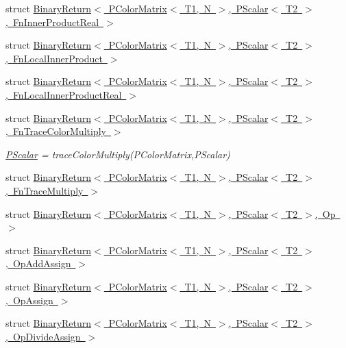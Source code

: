 \begin{DoxyCompactItemize}
\item 
struct \mbox{\hyperlink{structENSEM_1_1BinaryReturn_3_01PColorMatrix_3_01T1_00_01N_01_4_00_01PScalar_3_01T2_01_4_00_01FnInnerProductReal_01_4}{Binary\+Return$<$ P\+Color\+Matrix$<$ T1, N $>$, P\+Scalar$<$ T2 $>$, Fn\+Inner\+Product\+Real $>$}}
\item 
struct \mbox{\hyperlink{structENSEM_1_1BinaryReturn_3_01PColorMatrix_3_01T1_00_01N_01_4_00_01PScalar_3_01T2_01_4_00_01FnLocalInnerProduct_01_4}{Binary\+Return$<$ P\+Color\+Matrix$<$ T1, N $>$, P\+Scalar$<$ T2 $>$, Fn\+Local\+Inner\+Product $>$}}
\item 
struct \mbox{\hyperlink{structENSEM_1_1BinaryReturn_3_01PColorMatrix_3_01T1_00_01N_01_4_00_01PScalar_3_01T2_01_4_00_01FnLocalInnerProductReal_01_4}{Binary\+Return$<$ P\+Color\+Matrix$<$ T1, N $>$, P\+Scalar$<$ T2 $>$, Fn\+Local\+Inner\+Product\+Real $>$}}
\item 
struct \mbox{\hyperlink{structENSEM_1_1BinaryReturn_3_01PColorMatrix_3_01T1_00_01N_01_4_00_01PScalar_3_01T2_01_4_00_01FnTraceColorMultiply_01_4}{Binary\+Return$<$ P\+Color\+Matrix$<$ T1, N $>$, P\+Scalar$<$ T2 $>$, Fn\+Trace\+Color\+Multiply $>$}}
\begin{DoxyCompactList}\small\item\em \mbox{\hyperlink{classENSEM_1_1PScalar}{P\+Scalar}} = trace\+Color\+Multiply(\+P\+Color\+Matrix,\+P\+Scalar) \end{DoxyCompactList}\item 
struct \mbox{\hyperlink{structENSEM_1_1BinaryReturn_3_01PColorMatrix_3_01T1_00_01N_01_4_00_01PScalar_3_01T2_01_4_00_01FnTraceMultiply_01_4}{Binary\+Return$<$ P\+Color\+Matrix$<$ T1, N $>$, P\+Scalar$<$ T2 $>$, Fn\+Trace\+Multiply $>$}}
\item 
struct \mbox{\hyperlink{structENSEM_1_1BinaryReturn_3_01PColorMatrix_3_01T1_00_01N_01_4_00_01PScalar_3_01T2_01_4_00_01Op_01_4}{Binary\+Return$<$ P\+Color\+Matrix$<$ T1, N $>$, P\+Scalar$<$ T2 $>$, Op $>$}}
\item 
struct \mbox{\hyperlink{structENSEM_1_1BinaryReturn_3_01PColorMatrix_3_01T1_00_01N_01_4_00_01PScalar_3_01T2_01_4_00_01OpAddAssign_01_4}{Binary\+Return$<$ P\+Color\+Matrix$<$ T1, N $>$, P\+Scalar$<$ T2 $>$, Op\+Add\+Assign $>$}}
\item 
struct \mbox{\hyperlink{structENSEM_1_1BinaryReturn_3_01PColorMatrix_3_01T1_00_01N_01_4_00_01PScalar_3_01T2_01_4_00_01OpAssign_01_4}{Binary\+Return$<$ P\+Color\+Matrix$<$ T1, N $>$, P\+Scalar$<$ T2 $>$, Op\+Assign $>$}}
\item 
struct \mbox{\hyperlink{structENSEM_1_1BinaryReturn_3_01PColorMatrix_3_01T1_00_01N_01_4_00_01PScalar_3_01T2_01_4_00_01OpDivideAssign_01_4}{Binary\+Return$<$ P\+Color\+Matrix$<$ T1, N $>$, P\+Scalar$<$ T2 $>$, Op\+Divide\+Assign $>$}}

\end{DoxyCompactItemize}

